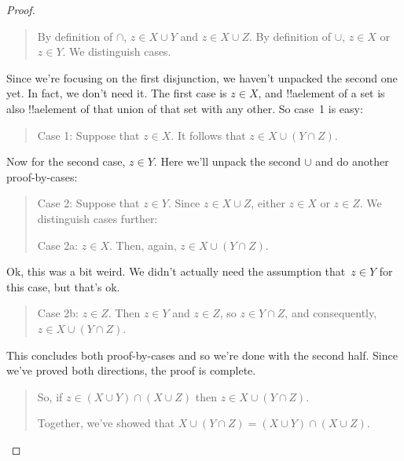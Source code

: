 \documentclass[../../../include/open-logic-section]{subfiles}
\begin{document}
\begin{proof}
\begin{quote}
By definition of $\cap$, $z \in X \cup Y$ and $z \in X \cup Z$. By
definition of $\cup$, $z \in X$ or $z \in Y$. We distinguish cases.
\end{quote}

Since we're focusing on the first disjunction, we haven't unpacked the
second one yet. In fact, we don't need it. The first case is $z \in
X$, and !!a{element} of a set is also !!a{element} of that union of
that set with any other. So case~1 is easy:

\begin{quote}
Case 1: Suppose that $z \in X$. It follows that $z \in X \cup (Y \cap
Z)$.
\end{quote}

Now for the second case, $z \in Y$. Here we'll unpack the second
$\cup$ and do another proof-by-cases:

\begin{quote}
Case 2: Suppose that $z \in Y$. Since $z \in X \cup Z$, either $z \in
X$ or $z \in Z$. We distinguish cases further:

Case 2a: $z \in X$. Then, again, $z \in X \cup (Y \cap Z)$.
\end{quote}

Ok, this was a bit weird. We didn't actually need the assumption
that~$z \in Y$ for this case, but that's ok.

\begin{quote}
Case 2b: $z \in Z$. Then $z \in Y$ and $z \in Z$, so $z \in Y \cap Z$,
and consequently, $z \in X \cup (Y \cap Z)$.
\end{quote}

This concludes both proof-by-cases and so we're done with the second
half. Since we've proved both directions, the proof is complete.

\begin{quote}
So, if $z \in (X \cup Y) \cap (X \cup Z)$ then $z \in X \cup (Y \cap Z)$.
  
Together, we've showed that $X \cup (Y \cap Z) = (X \cup Y) \cap (X
\cup Z)$.
\end{quote}
\end{proof}
\end{document}
